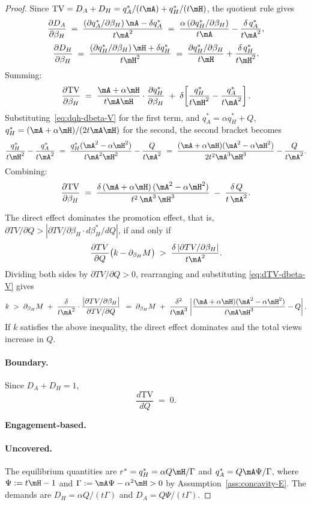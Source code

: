 \begin{proof}
Since $\text{TV} = D_A + D_H = q_A^*/(t\mA) + q_H^*/(t\mH)$, the quotient rule gives
\[
\frac{\partial D_A}{\partial\beta_H}
\;=\; \frac{(\partial q_A^*/\partial\beta_H)\,\mA - \delta q_A^*}{t\mA^2}
\;=\; \frac{\alpha\,(\partial q_H^*/\partial\beta_H)}{t\mA} - \frac{\delta\, q_A^*}{t\mA^2},
\]
\[
\frac{\partial D_H}{\partial\beta_H}
\;=\; \frac{(\partial q_H^*/\partial\beta_H)\,\mH + \delta q_H^*}{t\mH^2}
\;=\; \frac{\partial q_H^*/\partial\beta_H}{t\mH} + \frac{\delta\, q_H^*}{t\mH^2}.
\]
Summing:
\[
\frac{\partial\text{TV}}{\partial\beta_H}
\;=\; \frac{\mA + \alpha \mH}{t\mA\mH}\cdot\frac{\partial q_H^*}{\partial\beta_H}
\;+\; \delta\!\left[\frac{q_H^*}{t\mH^2} - \frac{q_A^*}{t\mA^2}\right].
\]
Substituting~\eqref{eq:dqh-dbeta-V} for the first term, and $q_A^* = \alpha q_H^* + Q$, $q_H^* = (\mA + \alpha \mH)/(2t\mA\mH)$ for the second, the second bracket becomes
\[
\frac{q_H^*}{t\mH^2} - \frac{q_A^*}{t\mA^2}
\;=\; \frac{q_H^*(\mA^2 - \alpha\mH^2)}{t\mA^2\mH^2} - \frac{Q}{t\mA^2}
\;=\; \frac{(\mA + \alpha \mH)(\mA^2 - \alpha\mH^2)}{2t^2\mA^3\mH^3} - \frac{Q}{t\mA^2}.
\]
Combining:
\begin{equation}\label{eq:dTV-dbeta-V}
\frac{\partial\text{TV}}{\partial\beta_H}
\;=\; \frac{\delta\,(\mA + \alpha \mH)\,(\mA^2 - \alpha\mH^2)}{t^2\,\mA^3\,\mH^3}
\;-\; \frac{\delta\,Q}{t\,\mA^2}.
\end{equation}



The direct effect dominates the promotion effect, that is, $\partial TV/\partial Q > |\partial TV/\partial\beta_H \cdot d\beta_H^*/dQ|$, if and only if
\[
\frac{\partial TV}{\partial Q}\bigl(k - \partial_{\beta_H} M\bigr)
\;>\; \frac{\delta\,|\partial TV/\partial\beta_H|}{t\mA^2}.
\]
Dividing both sides by $\partial TV/\partial Q > 0$, rearranging and substituting \eqref{eq:dTV-dbeta-V} gives
\[
k \;>\;  \partial_{\beta_H}M
\;+\; \frac{\delta}{t\mA^2}\cdot\frac{\bigl|\partial TV/\partial\beta_H\bigr|}{\partial TV/\partial Q}\,\;=\; \partial_{\beta_H}M
\;+\; \frac{\delta^2}{t\mA^3}\left|\frac{(\mA + \alpha \mH)(\mA^2 - \alpha\mH^2)}{t\mA\mH^3} - Q\right|.
\]
If $k$ satisfies the above inequality, the direct effect dominates and the total views increase in $Q$.


\paragraph{Boundary.}
Since $D_A + D_H = 1$,
\[
\frac{d \text{TV}}{d Q}\;=\; 0.
\]


\textbf{Engagement-based.}
\paragraph{Uncovered.}
The equilibrium quantities are $r^* = q_H^* = \alpha Q\mH/\Gamma$ and $q_A^* = Q\mA\Psi/\Gamma$, where $\Psi := t\mH - 1$ and $\Gamma := \mA\Psi - \alpha^2\mH > 0$ by Assumption~\ref{ass:concavity-E}. The demands are $D_H = \alpha Q/(t\Gamma)$ and $D_A = Q\Psi/(t\Gamma)$.


\end{proof}
